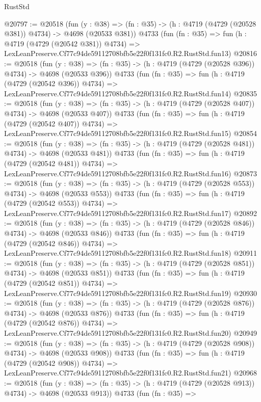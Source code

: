 \begin{lexlean}{RustStd}
\begin{coremodule}
@20797 := @20518
    (fun (y : @38) => (fn : @35) -> (h : @4719 (@4729 (@20528 @381)) @4734) -> @4698 (@20533 @381))
    @4733
    (fun (fn : @35) =>
    fun (h : @4719 (@4729 (@20542 @381)) @4734) =>
    LexLeanPreserve.Cf77c94de59112708bfb5e22f0f131fc0.R2.RustStd.fun13)
@20816 := @20518
    (fun (y : @38) => (fn : @35) -> (h : @4719 (@4729 (@20528 @396)) @4734) -> @4698 (@20533 @396))
    @4733
    (fun (fn : @35) =>
    fun (h : @4719 (@4729 (@20542 @396)) @4734) =>
    LexLeanPreserve.Cf77c94de59112708bfb5e22f0f131fc0.R2.RustStd.fun14)
@20835 := @20518
    (fun (y : @38) => (fn : @35) -> (h : @4719 (@4729 (@20528 @407)) @4734) -> @4698 (@20533 @407))
    @4733
    (fun (fn : @35) =>
    fun (h : @4719 (@4729 (@20542 @407)) @4734) =>
    LexLeanPreserve.Cf77c94de59112708bfb5e22f0f131fc0.R2.RustStd.fun15)
@20854 := @20518
    (fun (y : @38) => (fn : @35) -> (h : @4719 (@4729 (@20528 @481)) @4734) -> @4698 (@20533 @481))
    @4733
    (fun (fn : @35) =>
    fun (h : @4719 (@4729 (@20542 @481)) @4734) =>
    LexLeanPreserve.Cf77c94de59112708bfb5e22f0f131fc0.R2.RustStd.fun16)
@20873 := @20518
    (fun (y : @38) => (fn : @35) -> (h : @4719 (@4729 (@20528 @553)) @4734) -> @4698 (@20533 @553))
    @4733
    (fun (fn : @35) =>
    fun (h : @4719 (@4729 (@20542 @553)) @4734) =>
    LexLeanPreserve.Cf77c94de59112708bfb5e22f0f131fc0.R2.RustStd.fun17)
@20892 := @20518
    (fun (y : @38) => (fn : @35) -> (h : @4719 (@4729 (@20528 @846)) @4734) -> @4698 (@20533 @846))
    @4733
    (fun (fn : @35) =>
    fun (h : @4719 (@4729 (@20542 @846)) @4734) =>
    LexLeanPreserve.Cf77c94de59112708bfb5e22f0f131fc0.R2.RustStd.fun18)
@20911 := @20518
    (fun (y : @38) => (fn : @35) -> (h : @4719 (@4729 (@20528 @851)) @4734) -> @4698 (@20533 @851))
    @4733
    (fun (fn : @35) =>
    fun (h : @4719 (@4729 (@20542 @851)) @4734) =>
    LexLeanPreserve.Cf77c94de59112708bfb5e22f0f131fc0.R2.RustStd.fun19)
@20930 := @20518
    (fun (y : @38) => (fn : @35) -> (h : @4719 (@4729 (@20528 @876)) @4734) -> @4698 (@20533 @876))
    @4733
    (fun (fn : @35) =>
    fun (h : @4719 (@4729 (@20542 @876)) @4734) =>
    LexLeanPreserve.Cf77c94de59112708bfb5e22f0f131fc0.R2.RustStd.fun20)
@20949 := @20518
    (fun (y : @38) => (fn : @35) -> (h : @4719 (@4729 (@20528 @908)) @4734) -> @4698 (@20533 @908))
    @4733
    (fun (fn : @35) =>
    fun (h : @4719 (@4729 (@20542 @908)) @4734) =>
    LexLeanPreserve.Cf77c94de59112708bfb5e22f0f131fc0.R2.RustStd.fun21)
@20968 := @20518
    (fun (y : @38) => (fn : @35) -> (h : @4719 (@4729 (@20528 @913)) @4734) -> @4698 (@20533 @913))
    @4733
    (fun (fn : @35) =>

\end{coremodule}
\end{lexlean}
